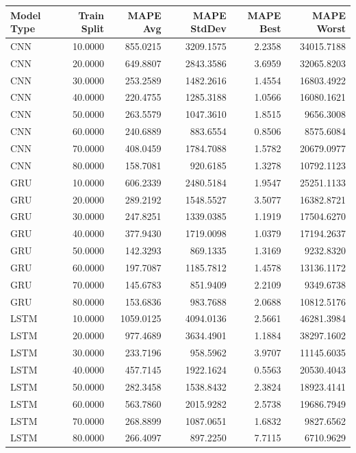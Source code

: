 \begin{tabular}{lrrrrr}
\toprule
Model Type & Train Split & MAPE Avg & MAPE StdDev & MAPE Best & MAPE Worst \\
\midrule
CNN & 10.0000 & 855.0215 & 3209.1575 & 2.2358 & 34015.7188 \\
CNN & 20.0000 & 649.8807 & 2843.3586 & 3.6959 & 32065.8203 \\
CNN & 30.0000 & 253.2589 & 1482.2616 & 1.4554 & 16803.4922 \\
CNN & 40.0000 & 220.4755 & 1285.3188 & 1.0566 & 16080.1621 \\
CNN & 50.0000 & 263.5579 & 1047.3610 & 1.8515 & 9656.3008 \\
CNN & 60.0000 & 240.6889 & 883.6554 & 0.8506 & 8575.6084 \\
CNN & 70.0000 & 408.0459 & 1784.7088 & 1.5782 & 20679.0977 \\
CNN & 80.0000 & 158.7081 & 920.6185 & 1.3278 & 10792.1123 \\
GRU & 10.0000 & 606.2339 & 2480.5184 & 1.9547 & 25251.1133 \\
GRU & 20.0000 & 289.2192 & 1548.5527 & 3.5077 & 16382.8721 \\
GRU & 30.0000 & 247.8251 & 1339.0385 & 1.1919 & 17504.6270 \\
GRU & 40.0000 & 377.9430 & 1719.0098 & 1.0379 & 17194.2637 \\
GRU & 50.0000 & 142.3293 & 869.1335 & 1.3169 & 9232.8320 \\
GRU & 60.0000 & 197.7087 & 1185.7812 & 1.4578 & 13136.1172 \\
GRU & 70.0000 & 145.6783 & 851.9409 & 2.2109 & 9349.6738 \\
GRU & 80.0000 & 153.6836 & 983.7688 & 2.0688 & 10812.5176 \\
LSTM & 10.0000 & 1059.0125 & 4094.0136 & 2.5661 & 46281.3984 \\
LSTM & 20.0000 & 977.4689 & 3634.4901 & 1.1884 & 38297.1602 \\
LSTM & 30.0000 & 233.7196 & 958.5962 & 3.9707 & 11145.6035 \\
LSTM & 40.0000 & 457.7145 & 1922.1624 & 0.5563 & 20530.4043 \\
LSTM & 50.0000 & 282.3458 & 1538.8432 & 2.3824 & 18923.4141 \\
LSTM & 60.0000 & 563.7860 & 2015.9282 & 2.5738 & 19686.7949 \\
LSTM & 70.0000 & 268.8899 & 1087.0651 & 1.6832 & 9827.6562 \\
LSTM & 80.0000 & 266.4097 & 897.2250 & 7.7115 & 6710.9629 \\

\end{tabular}
